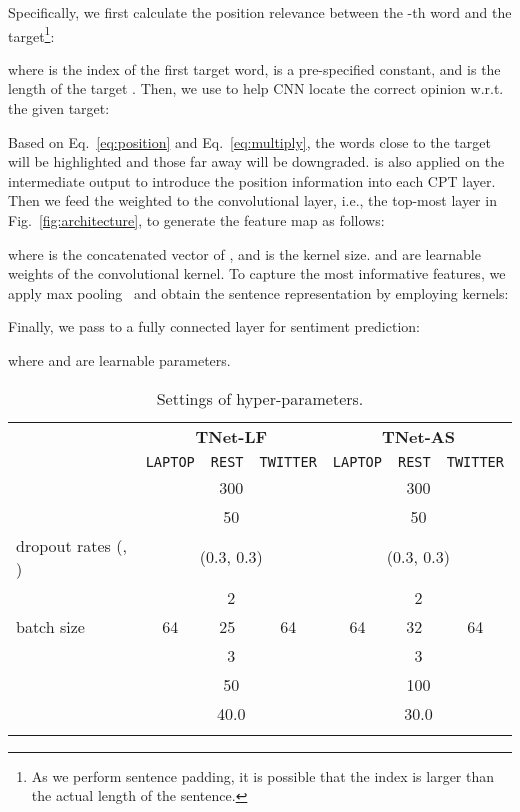 \documentclass[11pt,a4paper]{article}
\begin{document}
Specifically, we first calculate the position relevance  between the -th word and the target\footnote{As we perform sentence padding, it is possible that the index  is larger than the actual length  of the sentence.}:

where  is the index of the first target word,  is a pre-specified constant, and  is the length of the target . Then, we use  to help CNN locate the correct opinion w.r.t. the given target:

Based on Eq.~\ref{eq:position} and Eq.~\ref{eq:multiply}, the words close to the target will be highlighted and those far away will be downgraded.  is also applied on the intermediate output to introduce the position information into each CPT layer. Then we feed the weighted  to the convolutional layer, i.e., the top-most layer in Fig.~\ref{fig:architecture}, to generate the feature map  as follows:

where  is the concatenated vector of , and  is the kernel size.  and  are learnable weights of the convolutional kernel. To capture the most informative features, we apply max pooling~\cite{kim:2014:EMNLP2014} and obtain the sentence representation  by employing  kernels:

Finally, we pass  to a fully connected layer for sentiment prediction:

where  and  are learnable parameters.


\begin{table*}[!t]
    \centering
{\begin{tabular}{l|ccc|ccc}
    \Xhline{3\arrayrulewidth}
    \multirow{2}{*}{\textbf{Hyper-params}} & \multicolumn{3}{c}{\textbf{TNet-LF}} & \multicolumn{3}{|c}{\textbf{TNet-AS}} \\ \cline{2-7}
    & \texttt{LAPTOP} & \texttt{REST} & \texttt{TWITTER} & \texttt{LAPTOP} & \texttt{REST} & \texttt{TWITTER} \\ \hline
     & \multicolumn{3}{c}{300} & \multicolumn{3}{|c}{300} \\  & \multicolumn{3}{c}{50} & \multicolumn{3}{|c}{50}  \\ dropout rates (, ) & \multicolumn{3}{|c}{(0.3, 0.3)} & \multicolumn{3}{|c}{(0.3, 0.3)} \\  & \multicolumn{3}{c}{2} & \multicolumn{3}{|c}{2} \\
    batch size & 64 & 25 & 64 & 64 & 32 & 64 \\  & \multicolumn{3}{c}{3} & \multicolumn{3}{|c}{3} \\  & \multicolumn{3}{c}{50} & \multicolumn{3}{|c}{100} \\  & \multicolumn{3}{c}{40.0} & \multicolumn{3}{|c}{30.0} \\
    \Xhline{3\arrayrulewidth}
    \end{tabular}}
    \caption{Settings of hyper-parameters.}
    \label{tab:hyperparameter}
\end{table*}
\end{document}

